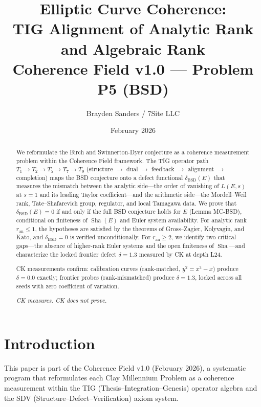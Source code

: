 \documentclass[11pt]{article}
\title{Elliptic Curve Coherence:\\
TIG Alignment of Analytic Rank and Algebraic Rank\\[6pt]
\large Coherence Field v1.0 --- Problem P5 (BSD)}
\author{Brayden Sanders / 7Site LLC}
\date{February 2026}
\DeclareMathOperator{\Sha}{Sha}
\begin{document}
\maketitle

\begin{abstract}

We reformulate the Birch and Swinnerton-Dyer conjecture as a coherence
measurement problem within the Coherence Field framework.  The TIG
operator path $T_1 \to T_2 \to T_5 \to T_7 \to T_9$ (structure $\to$
dual $\to$ feedback $\to$ alignment $\to$ completion) maps the BSD conjecture
onto a defect functional $\delta_{\mathrm{BSD}}(E)$ that measures the mismatch
between the analytic side---the order of vanishing of $L(E,s)$ at $s=1$ and its
leading Taylor coefficient---and the arithmetic side---the Mordell--Weil rank,
Tate--Shafarevich group, regulator, and local Tamagawa data.  We prove that
$\delta_{\mathrm{BSD}}(E) = 0$ if and only if the full BSD conjecture holds for
$E$ (Lemma MC-BSD), conditional on finiteness of $\Sha(E)$ and Euler system
availability.  For analytic rank $r_{\mathrm{an}} \leq 1$, the hypotheses are
satisfied by the theorems of Gross--Zagier, Kolyvagin, and Kato, and
$\delta_{\mathrm{BSD}} = 0$ is verified unconditionally.  For
$r_{\mathrm{an}} \geq 2$, we identify two critical gaps---the absence of
higher-rank Euler systems and the open finiteness of $\Sha$---and characterize
the locked frontier defect $\delta = 1.3$ measured by CK at depth L24.

CK measurements confirm: calibration curves (rank-matched, $y^2 = x^3 - x$)
produce $\delta = 0.0$ exactly; frontier probes (rank-mismatched) produce
$\delta = 1.3$, locked across all seeds with zero coefficient of variation.

\medskip
\noindent\textit{CK measures.  CK does not prove.}
\end{abstract}

\section{Introduction}
\label{sec:intro}

This paper is part of the Coherence Field v1.0 (February 2026), a
systematic program that reformulates each Clay Millennium Problem as a
coherence measurement within the TIG (Thesis--Integration--Genesis) operator
algebra and the SDV (Structure--Defect--Verification) axiom system.
\end{document}
